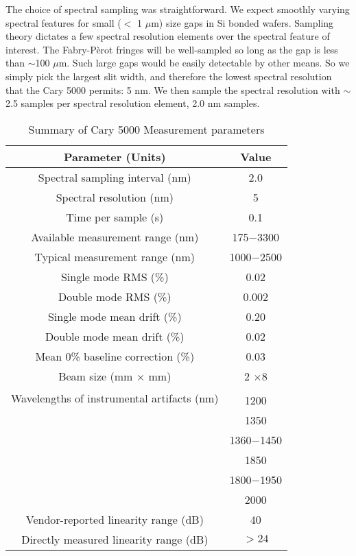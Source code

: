 \documentclass[osajnl,preprint,showpacs,superscriptaddress,12pt]{revtex4-1} %
\begin{document}
The choice of spectral sampling was straightforward.  We expect smoothly varying spectral features for small ($<$ 1 $\mu$m) size gaps in Si bonded wafers.  Sampling theory dictates a few spectral resolution elements over the spectral feature of interest.  The Fabry-P\`erot fringes will be well-sampled so long as the gap is less than $\sim$100 $\mu$m.  Such large gaps would be easily detectable by other means.  So we simply pick the largest slit width, and therefore the lowest spectral resolution that the Cary 5000 permits: 5 nm.  We then sample the spectral resolution with $\sim$2.5 samples per spectral resolution element, 2.0 nm samples. 


\begin{table}[h!]
\caption{Summary of Cary 5000 Measurement parameters}
\begin{center}
    \begin{tabular}{ c c }
    \hline
    Parameter (Units) & Value \\ 
        \hline
       Spectral sampling interval (nm) & 2.0 \\
       Spectral resolution (nm) & 5 \\
       Time per sample (s) & 0.1 \\
       Available measurement range (nm) & 175$-$3300 \\
       Typical measurement range (nm) & 1000$-$2500 \\
	Single mode RMS  (\%) & 0.02 \\
	Double mode RMS  (\%) & 0.002 \\
	Single mode mean drift (\%) & 0.20 \\
	Double mode mean drift (\%) & 0.02 \\
	Mean 0\% baseline correction (\%) & 0.03 \\
	Beam size (mm $\times$ mm) & 2 $\times$8 \\
	\multirow{2}{*}{Wavelengths of instrumental artifacts (nm)} &  \\
      &1200 \\
      &1350 \\
      &1360$-$1450\\
      &1850 \\
      &1800$-$1950 \\
      &2000 \\
      Vendor-reported linearity range (dB) & 40 \\
      Directly measured linearity range (dB) & $>24$ \\
    \hline
    \end{tabular}
\end{center}
\end{table}
\end{document}
